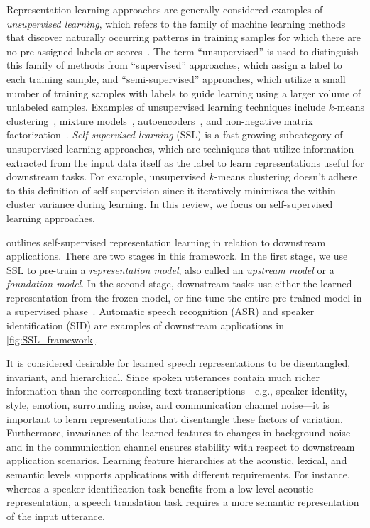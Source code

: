 Representation learning approaches are generally considered examples of \textit{unsupervised
learning}, which refers to the family of machine learning methods that discover
naturally occurring patterns in training samples for which there are no pre-assigned
labels or scores~\parencite{jordan_machine_2015}. 
The term ``unsupervised'' is used to distinguish this family of methods from
``supervised'' approaches, which assign a label to each training sample, and
``semi-supervised'' approaches, which utilize a small number of training samples
with labels to guide learning using a larger volume of unlabeled samples.
Examples of unsupervised learning techniques include $k$-means clustering~\parencite{gray_vector_1984}, mixture models~\parencite{jordan_hierarchical_1994}, autoencoders~\parencite{hinton_autoencoders_1994},
and non-negative matrix factorization~\parencite{lee_learning_1999}. 
\textit{Self-supervised learning} (SSL) is a fast-growing subcategory of
unsupervised learning approaches, which are techniques that utilize
information extracted from the input data itself as the label to learn
representations useful for 
downstream tasks. {\color{black} For example, unsupervised $k$-means clustering doesn't adhere to this definition of self-supervision since it iteratively minimizes the within-cluster variance during learning.}
In this review, we
focus on self-supervised learning approaches.

 outlines self-supervised representation learning in
relation to downstream applications. 
There are two stages in this framework.
In the first stage, we use SSL to pre-train a \textit{representation model},
also called an \textit{upstream model} or a \textit{foundation model}.
In the second stage, downstream tasks use either the learned
representation from the frozen model, or fine-tune the entire pre-trained model
in a supervised phase~\parencite{hinton_reducing_2006}. 
Automatic speech recognition (ASR) and speaker identification (SID) are 
examples of downstream applications in \cref{fig:SSL_framework}.

It is considered desirable for learned speech representations to be
disentangled, invariant, and hierarchical.
Since spoken utterances contain much richer information than the corresponding text
transcriptions---e.g., speaker identity, style, emotion, surrounding noise, and
communication channel noise---it is important to learn representations that
disentangle these factors of variation. Furthermore, invariance of the learned
features to changes in background noise and in the communication channel ensures
stability with respect to downstream application scenarios. Learning feature
hierarchies at the acoustic, lexical, and semantic levels supports applications
with different requirements. For instance, whereas a speaker identification task
benefits from a low-level acoustic representation, a speech
translation task requires a more semantic representation of the input
utterance. 

